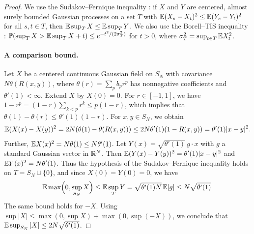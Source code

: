 \begin{proof}
We use the Sudakov--Fernique inequality \cite[Theorem~2.2.3]{AdlerTaylor2007}: if $X$ and $Y$ are centered, almost surely bounded Gaussian processes on a set $T$ with $\mathbb E(X_s-X_t)^2\le\mathbb E(Y_s-Y_t)^2$ for all $s,t\in T$, then $\mathbb E\sup_TX\le\mathbb E\sup_TY$. We also use the Borell--TIS inequality \cite[Theorem~2.1.1]{AdlerTaylor2007}: $\mathbb P(\sup_TX>\mathbb E\sup_TX+t)\le e^{-t^2/(2\sigma_T^2)}$ for $t>0$, where $\sigma_T^2=\sup_{t\in T}\mathbb E X_t^2$.

\paragraph{A comparison bound.} Let $X$ be a centered continuous Gaussian field on $S_N$ with covariance $N\theta(R(x,y))$, where $\theta(r)=\sum_pb_pr^p$ has nonnegative coefficients and $\theta'(1)<\infty$. Extend $X$ by $X(0)=0$. For $r\in[-1,1]$, we have $1-r^p=(1-r)\sum_{k<p}r^k\le p(1-r)$, which implies that $\theta(1)-\theta(r)\le\theta'(1)(1-r)$. For $x,y\in S_N$, we obtain
\begin{equation*}
\mathbb E(X(x)-X(y))^2=2N(\theta(1)-\theta(R(x,y)))\le2N\theta'(1)(1-R(x,y))=\theta'(1)|x-y|^2.
\end{equation*}
Further, $\mathbb E X(x)^2=N\theta(1)\le N\theta'(1)$. Let $Y(x)=\sqrt{\theta'(1)}\,g\cdot x$ with $g$ a standard Gaussian vector in $\mathbb R^N$. Then $\mathbb E(Y(x)-Y(y))^2=\theta'(1)|x-y|^2$ and $\mathbb E Y(x)^2=N\theta'(1)$. Thus the hypothesis of the Sudakov--Fernique inequality holds on $T=S_N\cup\{0\}$, and since $X(0)=Y(0)=0$, we have
\begin{equation}\label{eq:inf-SF}
\mathbb E\max\Bigl(0,\sup_{S_N}X\Bigr)\le\mathbb E\sup_{T}Y=\sqrt{\theta'(1)N}\,\mathbb E|g|\le N\sqrt{\theta'(1)}.
\end{equation}
The same bound holds for $-X$. Using $\sup|X|\le\max(0,\sup X)+\max(0,\sup(-X))$, we conclude that $\mathbb E\sup_{S_N}|X|\le2N\sqrt{\theta'(1)}$.


\end{proof}
